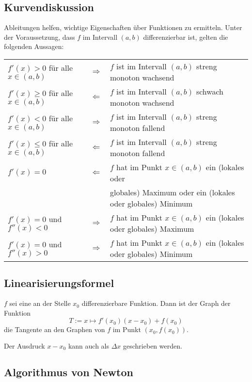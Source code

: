 \subsection{Kurvendiskussion}

Ableitungen helfen, wichtige Eigenschaften über Funktionen zu ermitteln. Unter der Voraussetzung,
dass $f$ im Intervall $(a, b)$ differenzierbar ist, gelten die folgenden Aussagen:

\begin{tabular}{|lcl|}
\hline
$f'(x) > 0$ für alle $x \in (a,b)$ & $\Rightarrow$ & $f$ ist im Intervall $(a,b)$ streng monoton wachsend \\
$f'(x) \geq 0$ für alle $x \in (a,b)$ & $\Leftarrow$ & $f$ ist im Intervall $(a,b)$ schwach monoton wachsend \\
\hline
$f'(x) < 0$ für alle $x \in (a,b)$ & $\Rightarrow$ & $f$ ist im Intervall $(a,b)$ streng monoton fallend \\
$f'(x) \leq 0$ für alle $x \in (a,b)$ & $\Leftarrow$ & $f$ ist im Intervall $(a,b)$ streng monoton fallend \\
\hline
$f'(x) = 0$ & $\Leftarrow$ & $f$ hat im Punkt $x \in (a,b)$ ein (lokales oder\\&&globales) Maximum oder ein (lokales oder globales) Minimum \\
\hline
$f'(x) = 0$ und $f''(x) < 0$ & $\Rightarrow$ & $f$ hat im Punkt $x \in (a,b)$ ein (lokales oder globales) Maximum \\
$f'(x) = 0$ und $f''(x) > 0$ & $\Rightarrow$ & $f$ hat im Punkt $x \in (a,b)$ ein (lokales oder globales) Minimum \\
\hline
\end{tabular} 

\subsection{Linearisierungsformel}

$f$ sei eine an der Stelle $x_0$ differenzierbare Funktion. Dann ist der Graph der Funktion
%
\begin{displaymath}
	T := x \mapsto f'(x_0)(x-x_0) + f(x_0)
\end{displaymath}
%
die Tangente an den Graphen von $f$ im Punkt $(x_0, f(x_0))$.

Der Ausdruck $x - x_0$ kann auch als $\Delta x$ geschrieben werden.


\subsection{Algorithmus von Newton}

